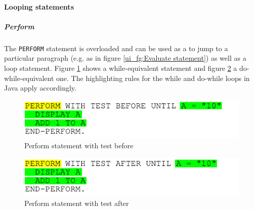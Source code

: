 \paragraph{Looping statements}
\subparagraph{Perform}
The \texttt{PERFORM} statement is overloaded and can be used as a  to jump to a particular paragraph (e.g. as in figure \ref{ui_fg:Evaluate statement}) as well as a loop statement. Figure \ref{ui_fg:Perform statement with test before} shows a while-equivalent statement and figure \ref{ui_fg:Perform statement with test after} a do-while-equivalent one. The highlighting rules for the while and do-while loops in Java apply accordingly. 
\begin{figure}[htp]
 \centering
 \includegraphics[]{images/Source_Code_Highlighting/perform/perform_wtb_yellow}
 \caption{Perform statement with test before}
 \label{ui_fg:Perform statement with test before}
\end{figure}
\begin{figure}[htp]
 \centering
 \includegraphics[]{images/Source_Code_Highlighting/perform/perform_wta_yellow}
 \caption{Perform statement with test after}
 \label{ui_fg:Perform statement with test after}
\end{figure}
\par

